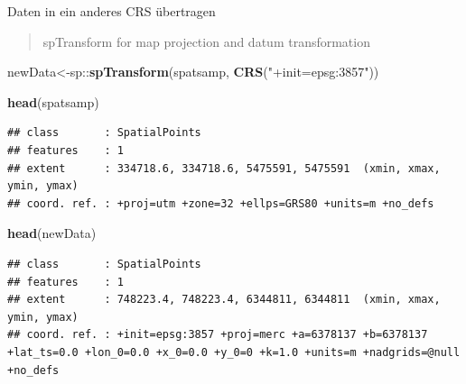 \documentclass[ignorenonframetext,]{beamer}
\newenvironment{Shaded}{\begin{snugshade}}{\end{snugshade}}
\newcommand{\KeywordTok}[1]{\textcolor[rgb]{0.26,0.66,0.93}{\textbf{#1}}}
\newcommand{\NormalTok}[1]{\textcolor[rgb]{0.74,0.68,0.62}{#1}}
\newcommand{\OperatorTok}[1]{\textcolor[rgb]{0.74,0.68,0.62}{#1}}
\newcommand{\StringTok}[1]{\textcolor[rgb]{0.02,0.61,0.04}{#1}}
\begin{document}
\begin{frame}[fragile]{Daten in ein anderes CRS übertragen}
\protect\hypertarget{daten-in-ein-anderes-crs-ubertragen}{}

\begin{quote}
spTransform for map projection and datum transformation
\end{quote}

\begin{Shaded}
\begin{Highlighting}[]
\NormalTok{newData<-sp}\OperatorTok{::}\KeywordTok{spTransform}\NormalTok{(spatsamp, }\KeywordTok{CRS}\NormalTok{(}\StringTok{"+init=epsg:3857"}\NormalTok{))}
\end{Highlighting}
\end{Shaded}

\begin{Shaded}
\begin{Highlighting}[]
\KeywordTok{head}\NormalTok{(spatsamp)}
\end{Highlighting}
\end{Shaded}

\begin{verbatim}
## class       : SpatialPoints 
## features    : 1 
## extent      : 334718.6, 334718.6, 5475591, 5475591  (xmin, xmax, ymin, ymax)
## coord. ref. : +proj=utm +zone=32 +ellps=GRS80 +units=m +no_defs
\end{verbatim}

\begin{Shaded}
\begin{Highlighting}[]
\KeywordTok{head}\NormalTok{(newData)}
\end{Highlighting}
\end{Shaded}

\begin{verbatim}
## class       : SpatialPoints 
## features    : 1 
## extent      : 748223.4, 748223.4, 6344811, 6344811  (xmin, xmax, ymin, ymax)
## coord. ref. : +init=epsg:3857 +proj=merc +a=6378137 +b=6378137 +lat_ts=0.0 +lon_0=0.0 +x_0=0.0 +y_0=0 +k=1.0 +units=m +nadgrids=@null +no_defs
\end{verbatim}

\end{frame}
\end{document}
